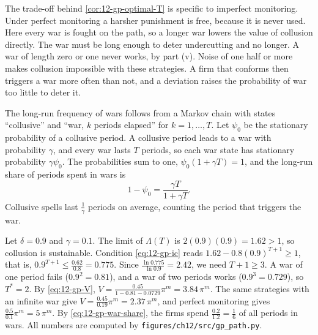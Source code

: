 The trade-off behind \cref{cor:12-gp-optimal-T} is specific to imperfect monitoring. Under perfect monitoring a
harsher punishment is free, because it is never used. Here every war is fought on the path, so a longer war lowers
the value of collusion directly. The war must be long enough to deter undercutting and no longer. A war of length
zero or one never works, by part (v). Noise of one half or more makes collusion impossible with these strategies.
A firm that conforms then triggers a war more often than not, and a deviation raises the probability of war too
little to deter it.

The long-run frequency of wars follows from a Markov chain with states ``collusive'' and ``war, $k$ periods
elapsed'' for $k = 1, \dots, T$. Let $\psi_0$ be the stationary probability of a collusive period. A collusive period
leads to a war with probability $\gamma$, and every war lasts $T$ periods, so each war state has stationary
probability $\gamma\psi_0$. The probabilities sum to one, $\psi_0(1 + \gamma T) = 1$, and the long-run share of
periods spent in wars is
\begin{equation}\label{eq:12-gp-war-share}
1 - \psi_0 = \frac{\gamma T}{1 + \gamma T} .
\end{equation}
Collusive spells last $\frac{1}{\gamma}$ periods on average, counting the period that triggers the war.

\begin{example}[Numbers]\label{ex:12-gp-numbers}
Let $\delta = 0.9$ and $\gamma = 0.1$. The limit of $\Lambda(T)$ is $2(0.9)(0.9) = 1.62 > 1$, so collusion is
sustainable. Condition \eqref{eq:12-gp-ic} reads $1.62 - 0.8(0.9)^{T + 1} \ge 1$, that is,
$0.9^{T + 1} \le \frac{0.62}{0.8} = 0.775$. Since $\frac{\ln 0.775}{\ln 0.9} = 2.42$, we need $T + 1 \ge 3$. A war of
one period fails ($0.9^2 = 0.81$), and a war of two periods works ($0.9^3 = 0.729$), so $T^* = 2$. By
\eqref{eq:12-gp-V}, $V = \frac{0.45}{1 - 0.81 - 0.0729}\pi^m = 3.84\,\pi^m$. The same strategies with an infinite war
give $V = \frac{0.45}{0.19}\pi^m = 2.37\,\pi^m$, and perfect monitoring gives $\frac{0.5}{0.1}\pi^m = 5\,\pi^m$. By
\eqref{eq:12-gp-war-share}, the firms spend $\frac{0.2}{1.2} = \frac{1}{6}$ of all periods in wars. All numbers are
computed by \texttt{figures/ch12/src/gp\_path.py}.
\end{example}

